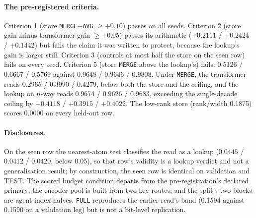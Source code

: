 \documentclass{article} %
\begin{document}
\paragraph{The pre-registered criteria.} Criterion 1 (store \texttt{MERGE}$-$\texttt{AVG} $\ge+0.10$) passes on all seeds.
Criterion 2 (store gain minus transformer gain $\ge+0.05$) passes its arithmetic ($+0.2111$ / $+0.2424$
/ $+0.1442$) but fails the claim it was written to protect, because the lookup's gain is larger
still. Criterion 3 (controls at most half the store on the seen row) fails on every seed. Criterion 5 (store
\texttt{MERGE} above the lookup's) fails: 0.5126 / 0.6667 / 0.5769 against 0.9648 / 0.9646 /
0.9808. Under \texttt{MERGE}, the transformer reads 0.2965 / 0.3990 / 0.4279, below both the store
and the ceiling, and the lookup on $n$-way reads 0.9674 / 0.9626 / 0.9683, exceeding the
single-decode ceiling by $+0.4118$ / $+0.3915$ / $+0.4022$. The low-rank store
(rank/width 0.1875) scores 0.0000 on every held-out row. %

\paragraph{Disclosures.} On the seen row the nearest-atom test classifies the read as a lookup
($0.0445$ / $0.0412$ / $0.0420$, below 0.05), so that row's validity is a lookup verdict and not a
generalisation result; by construction, the seen row is identical on validation and TEST. The
scored budget condition departs from the pre-registration's declared primary; the encoder pool is built
from two-key routes; and the split's two blocks are agent-index halves. \texttt{FULL} reproduces
the earlier read's band (0.1594 against 0.1590 on a validation leg) but is not a bit-level
replication. %
\end{document}
